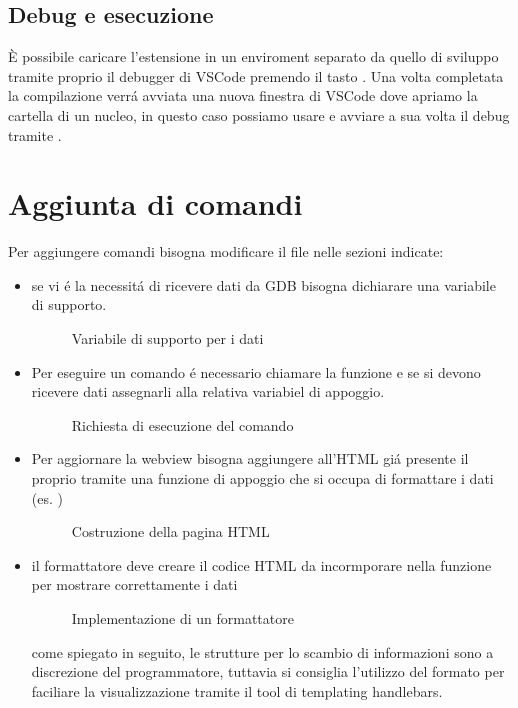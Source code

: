 \subsection*{Debug e esecuzione}
È possibile caricare l'estensione in un enviroment separato da quello di sviluppo tramite proprio il debugger di VSCode premendo il tasto . Una volta completata la compilazione verrá avviata una nuova finestra di VSCode dove apriamo la cartella di un nucleo, in questo caso possiamo usare  e avviare a sua volta il debug tramite .

\section{Aggiunta di comandi}
Per aggiungere comandi bisogna modificare il file  nelle sezioni indicate:
\begin{itemize}
    \item {
        se vi é la necessitá di ricevere dati da GDB bisogna dichiarare una variabile di supporto.
        \begin{figure}[H]
            
            \caption{Variabile di supporto per i dati}
        \end{figure}
    }
    \item {
        Per eseguire un comando é necessario chiamare la funzione \linebreak {} e se si devono ricevere dati assegnarli alla relativa variabiel di appoggio.
        \begin{figure}[H]
            
            \caption{Richiesta di esecuzione del comando}
        \end{figure}
    }
    \item {
        Per aggiornare la webview bisogna aggiungere all'HTML giá presente il proprio tramite  una funzione di appoggio che si occupa di formattare i dati (es. )
        \begin{figure}[H]
            
            \caption{Costruzione della pagina HTML}
        \end{figure}
    }
    \item {
        il formattatore deve creare il codice HTML da incormporare nella funzione  per mostrare correttamente i dati
        \begin{figure}[H]
            
            \caption{Implementazione di un formattatore}
        \end{figure}
        come spiegato in seguito, le strutture per lo scambio di informazioni sono a discrezione del programmatore, tuttavia si consiglia l'utilizzo del formato  per faciliare la visualizzazione tramite il tool di templating handlebars\cite{handlebars}.
    }
\end{itemize}
